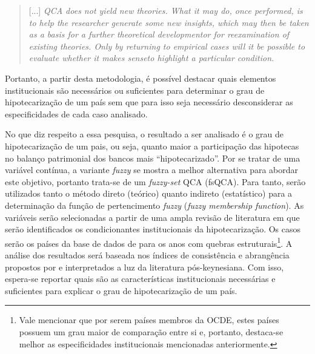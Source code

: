 \begin{quote}
	
	[...] \textit{QCA does not yield new theories. What it may do, once
		performed, is to help the researcher generate some new insights, which
		may then be taken as a basis for a further theoretical developmentor for
		reexamination of existing theories. Only by returning to empirical cases
		will it be possible to evaluate whether it makes senseto highlight a particular condition.} 
\end{quote}		
Portanto, a partir desta metodologia, é possível destacar quais elementos institucionais são necessários ou suficientes para determinar o grau de hipotecarização de um país sem que para isso seja necessário desconsiderar as especificidades de cada caso analisado.

No que diz respeito a essa pesquisa, o resultado a ser analisado é o grau de hipotecarização de um pais, ou seja, quanto maior a participação das hipotecas no balanço patrimonial dos bancos mais ``hipotecarizado''.
Por se tratar de uma variável contínua, a variante \textit{fuzzy} se mostra a melhor alternativa para abordar este objetivo, portanto trata-se de um \textit{fuzzy-set} QCA (fsQCA).
Para tanto, serão utilizados tanto o método direto (teórico) quanto
indireto (estatístico) para a determinação da função de pertencimento \textit{fuzzy} (\textit{fuzzy membership function}).
As variáveis serão selecionadas a partir de uma ampla revisão de literatura em que serão identificados os condicionantes institucionais da hipotecarização.
Os casos serão os países da base de dados de \textcite{jorda_great_2014} para os anos com quebras estruturais\footnote{Vale mencionar que por serem países membros da OCDE, estes países possuem um grau maior de comparação entre si e, portanto, destaca-se melhor as especificidades institucionais mencionadas anteriormente.}.
A análise dos resultados será baseada nos índices de consistência e abrangência propostos por \textcite{ragin_set_2006} e interpretados a luz da literatura pós-keynesiana.
Com isso, espera-se reportar quais são as características institucionais necessárias e suficientes para explicar o grau de hipotecarização de um país.

